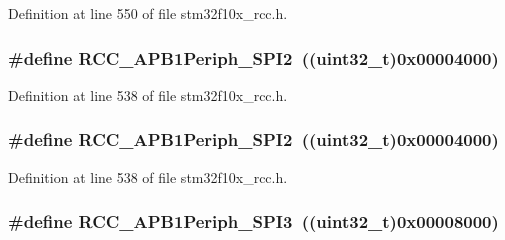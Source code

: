 Definition at line 550 of file stm32f10x\+\_\+rcc.\+h.

\subsubsection[{\texorpdfstring{R\+C\+C\+\_\+\+A\+P\+B1\+Periph\+\_\+\+S\+P\+I2}{RCC_APB1Periph_SPI2}}]{\setlength{\rightskip}{0pt plus 5cm}\#define R\+C\+C\+\_\+\+A\+P\+B1\+Periph\+\_\+\+S\+P\+I2~(({\bf uint32\+\_\+t})0x00004000)}\hypertarget{group___a_p_b1__peripheral_gaa21f1dfb4fcf241c6f85a048eaca29df}{}\label{group___a_p_b1__peripheral_gaa21f1dfb4fcf241c6f85a048eaca29df}


Definition at line 538 of file stm32f10x\+\_\+rcc.\+h.

\subsubsection[{\texorpdfstring{R\+C\+C\+\_\+\+A\+P\+B1\+Periph\+\_\+\+S\+P\+I2}{RCC_APB1Periph_SPI2}}]{\setlength{\rightskip}{0pt plus 5cm}\#define R\+C\+C\+\_\+\+A\+P\+B1\+Periph\+\_\+\+S\+P\+I2~(({\bf uint32\+\_\+t})0x00004000)}\hypertarget{group___a_p_b1__peripheral_gaa21f1dfb4fcf241c6f85a048eaca29df}{}\label{group___a_p_b1__peripheral_gaa21f1dfb4fcf241c6f85a048eaca29df}


Definition at line 538 of file stm32f10x\+\_\+rcc.\+h.

\subsubsection[{\texorpdfstring{R\+C\+C\+\_\+\+A\+P\+B1\+Periph\+\_\+\+S\+P\+I3}{RCC_APB1Periph_SPI3}}]{\setlength{\rightskip}{0pt plus 5cm}\#define R\+C\+C\+\_\+\+A\+P\+B1\+Periph\+\_\+\+S\+P\+I3~(({\bf uint32\+\_\+t})0x00008000)}\hypertarget{group___a_p_b1__peripheral_gabb0b40e839ef7403b086482e89d56f35}{}\label{group___a_p_b1__peripheral_gabb0b40e839ef7403b086482e89d56f35}


